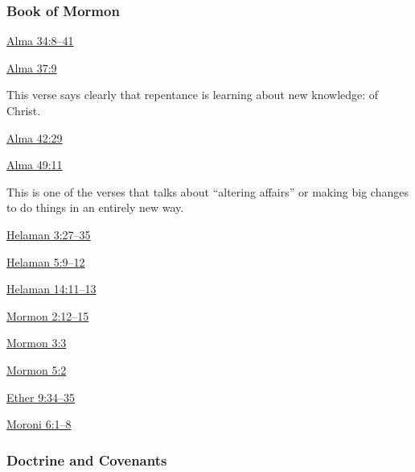 	\subsubsection{Book of Mormon} %
		\label{REPENTANCE-BOM}
	
		
		\begin{compactdesc}
			\item[{\hyperref[ALMA-34-8]{Alma 34:8--41}}]
			\item[{\hyperref[ALMA-37-9]{Alma 37:9}}] \phantom{.}
				\begin{compactitem}
					\item This verse says clearly that repentance is learning about new knowledge: of Christ.
				\end{compactitem}
			\item[{\hyperref[ALMA-42-29]{Alma 42:29}}]
			\item[{\hyperref[ALMA-49-11]{Alma 49:11}}] \phantom{.}
				\begin{compactitem}
					\item This is one of the verses that talks about ``altering affairs'' or making big changes to do things in an entirely new way.
				\end{compactitem}
			\item[{\hyperref[HELAMAN-3-27]{Helaman 3:27--35}}]
			\item[{\hyperref[HELAMAN-5-9]{Helaman 5:9--12}}]
			\item[{\hyperref[HELAMAN-14-11]{Helaman 14:11--13}}]
			\item[{\hyperref[MORMON-2-12]{Mormon 2:12--15}}]
			\item[{\hyperref[MORMON-3-3]{Mormon 3:3}}]
			\item[{\hyperref[MORMON-5-2]{Mormon 5:2}}]
			\item[{\hyperref[ETHER-9-34]{Ether 9:34--35}}]
			\item[{\hyperref[MORONI-6-1]{Moroni 6:1--8}}]
		\end{compactdesc}
		
	\subsubsection{Doctrine and Covenants} %
		\label{REPENTANCE-DC}
	
		
